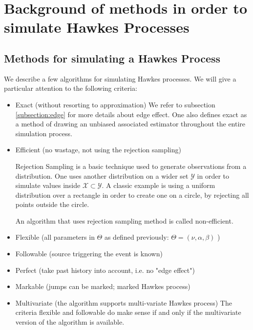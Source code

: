 \chapter{Background of methods in order to simulate Hawkes Processes}
\label{appendix_simulate}


\section{Methods for simulating a Hawkes Process}
\label{section:definition_algo}
We describe a few algorithms for simulating Hawkes processes. We will give a particular attention to the following criteria:

\begin{itemize}
\setlength{\itemindent}{2 cm}
\item Exact (without resorting to approximation)
We refer to subsection \ref{subsection:edge} for more details about edge effect. One also defines exact as a method of drawing an unbiased associated estimator throughout the entire simulation process. 
\item Efficient (no wastage, not using the rejection sampling)

\begin{definition}
Rejection Sampling is a basic technique used to generate observations from a distribution. One uses another distribution on a wider set $\mathcal Y$ in order to simulate values inside $\mathcal X \subset \mathcal Y$. A classic example is using a uniform distribution over a rectangle in order to create one on a circle, by rejecting all points outside the circle. 
\end{definition}

An algorithm that uses rejection sampling method is called non-efficient. 

\item Flexible (all parameters in $\Theta$ as defined previously: $ \Theta = ( \nu, \alpha, \beta ) $ )
\item Followable (source triggering the event is known)
\item Perfect (take past history into account, i.e. no "edge effect")
\item Markable (jumps can be marked; marked Hawkes process)
\item Multivariate (the algorithm supports multi-variate Hawkes process)
The criteria flexible and followable do make sense if and only if the multivariate version of the algorithm is available.

\end{itemize}


